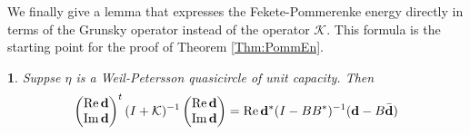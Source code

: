\documentclass{article}
\numberwithin{equation}{section}
\numberwithin{figure}{section}
\theoremstyle{plain}
\theoremstyle{plain}
\newtheorem{lemma}[thm]{\protect\lemmaname}
\numberwithin{thm}{section}
\theoremstyle{remark}
\providecommand{\lemmaname}{Lemma}
\newcommand{\re}{\text{{\rm Re}\,}}
\newcommand{\im}{\text{{\rm Im}\,}}
\begin{document}
We finally give a lemma that expresses the Fekete-Pommerenke energy directly in terms of the Grunsky operator instead of the operator $\mathcal{K}$. This formula is the starting point for the proof of Theorem \ref{Thm:PommEn}.
\begin{lemma}\label{Lem:KtoB}
Suppse $\eta$ is a Weil-Petersson quasicircle of unit capacity. Then
\begin{equation}
\begin{pmatrix}
     \re {\bf d} \\ \im {\bf d}
 \end{pmatrix} ^t(I+\mathcal{K})^{-1} 
\begin{pmatrix}
     \re {\bf d} \\ \im {\bf d}
 \end{pmatrix}=\re {\bf d}^*(I-BB^*)^{-1}({\bf d}-B\bar{{\bf d}})
 \end{equation}
\end{lemma}
\end{document}

